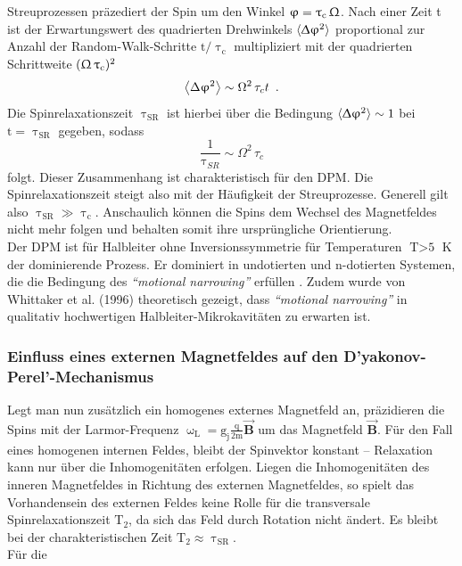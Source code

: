 Streuprozessen präzediert der Spin um den Winkel $\upvarphi=\uptau_\text{c} \,
\Upomega$. Nach einer Zeit t ist der Erwartungswert des quadrierten Drehwinkels
$\Braket{\Updelta\upvarphi^\text{2}}$ proportional zur Anzahl der
Random-Walk-Schritte $\text{t}/\uptau_\text{c}$ multipliziert mit der
quadrierten Schrittweite $(\Upomega\, \uptau_\text{c})^\text{2}$
\begin{equation} \Braket{\Delta\upvarphi^2} \sim \Omega^2\,\tau_c t \,\text{ .}
\end{equation} Die Spinrelaxationszeit $\uptau_\text{SR}$ ist hierbei über die
Bedingung $\Braket{\Updelta\upvarphi^\text{2}} \sim \text{1}$ bei
$\text{t}=\uptau_\text{SR}$ gegeben, sodass \begin{equation}
\frac{1}{\uptau_{SR}} \sim \Omega^2\, \tau_c \end{equation} folgt. Dieser
Zusammenhang ist charakteristisch für den DPM. Die Spinrelaxationszeit steigt
also mit der Häufigkeit der Streuprozesse. Generell gilt also $\uptau_\text{SR}
\gg \uptau_\text{c}$.  Anschaulich können die Spins dem Wechsel des Magnetfeldes
nicht mehr folgen und behalten somit ihre ursprüngliche Orientierung.\\ Der DPM
ist für Halbleiter ohne Inversionssymmetrie für Temperaturen $\text{T}>\text{5}$
K der dominierende Prozess. Er dominiert in undotierten und n-dotierten
Systemen, die die Bedingung des \textit{``motional narrowing''} erfüllen
\cite{Zutic.2004}. Zudem wurde von Whittaker et al. (1996) \cite{Whittaker.1996}
theoretisch gezeigt, dass \textit{``motional narrowing''} in qualitativ
hochwertigen Halbleiter-Mikrokavitäten zu erwarten ist. \subsubsection{Einfluss
eines externen Magnetfeldes auf den D'yakonov-Perel'-Mechanismus}
\label{DPM_Mag} Legt man nun zusätzlich ein homogenes externes Magnetfeld an,
präzidieren die Spins mit der Larmor-Frequenz
$\upomega_\text{L}=\text{g}_\text{j}\frac{\text{q}}{\text{2m}}\vec{\textbf{B}}$
um das Magnetfeld $\vec{\textbf{B}}$. Für den Fall eines homogenen internen
Feldes, bleibt der Spinvektor konstant – Relaxation kann nur über die
Inhomogenitäten erfolgen. Liegen die Inhomogenitäten des inneren Magnetfeldes in
Richtung des externen Magnetfeldes, so spielt das Vorhandensein des externen
Feldes keine Rolle für die transversale Spinrelaxationszeit $\text{T}_\text{2}$,
da sich das Feld durch Rotation nicht ändert. Es bleibt bei der
charakteristischen Zeit $\text{T}_\text{2} \approx \uptau_\text{SR}$.\\ Für die
